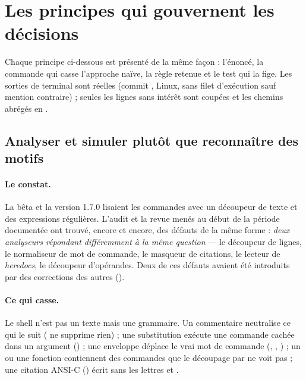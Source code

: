 \section{Les principes qui gouvernent les décisions}
\label{sec:principes}

Chaque principe ci-dessous est présenté de la même façon : l'énoncé, la commande qui casse
l'approche naïve, la règle retenue et le test qui la fige. Les sorties de terminal sont
réelles (commit \commitref{}, Linux, sans filet d'exécution sauf mention contraire) ; seules
les lignes sans intérêt sont coupées et les chemins abrégés en .

\subsection{Analyser et simuler plutôt que reconnaître des motifs}
\label{sec:pourquoi-moteur}

\paragraph{Le constat.} La bêta et la version 1.7.0 lisaient les commandes avec un
découpeur de texte et des expressions régulières. L'audit et la revue menés au début de la
période documentée ont trouvé, encore et encore, des défauts de la même forme : \emph{deux
analyseurs répondant différemment à la même question} --- le découpeur de lignes, le
normaliseur de mot de commande, le masqueur de citations, le lecteur de \textit{heredocs},
le découpeur d'opérandes. Deux de ces défauts avaient été introduits par des corrections
des autres ().

\paragraph{Ce qui casse.} Le shell n'est pas un texte mais une grammaire. Un commentaire
neutralise ce qui le suit ( ne supprime rien) ; une substitution
\cmd{\$(\ldots)} exécute une commande cachée dans un argument () ; une enveloppe déplace le vrai mot de commande (,
, ) ; un  ou une
fonction contiennent des commandes que le découpage par \cmd{;} ne voit pas ; une citation
ANSI-C () écrit  sans les lettres  et .

